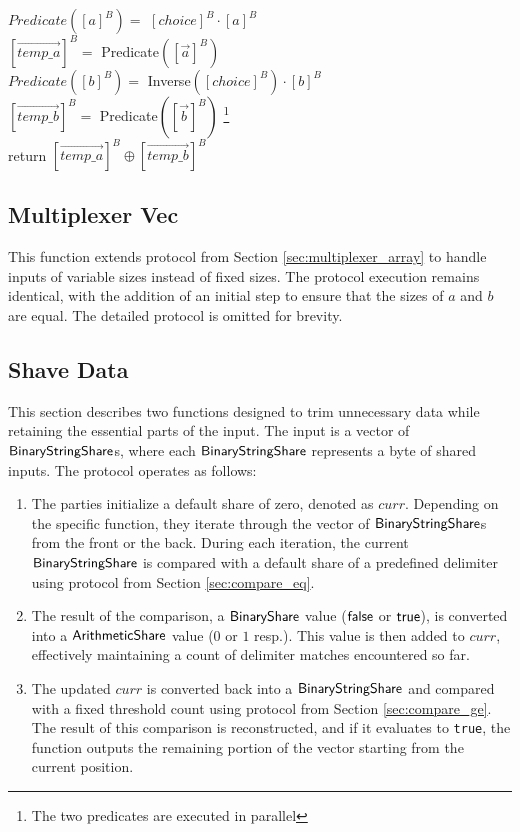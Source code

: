 \begin{protocol}[MultiplexerArray$({[choice]^B}, {[\vec{a}]^B}, {[\vec{b}]^B})$]
	$Predicate([a]^B) =$ ${[choice]^B} \cdot {[a]^B}$\\
	${[\vec{temp\_a}]^B} =$ Predicate$({[\vec{a}]^B})$\\
	$Predicate([b]^B) =$ Inverse$({[choice]^B}) \cdot {[b]^B}$\\
	${[\vec{temp\_b}]^B} =$ Predicate$({[\vec{b}]^B})$ \footnote{The two predicates are executed in parallel} \\ 
        return ${[\vec{temp\_a}]^B} \oplus {[\vec{temp\_b}]^B}$
\end{protocol}

\subsection{Multiplexer Vec}
\label{sec:multiplexer_vec}

This function extends protocol from Section \ref{sec:multiplexer_array} to handle inputs of variable sizes instead of fixed sizes. The protocol execution remains identical, with the addition of an initial step to ensure that the sizes of $a$ and $b$ are equal. The detailed protocol is omitted for brevity.

\subsection{Shave Data}
\label{sec:shave_data}

This section describes two functions designed to trim unnecessary data while retaining the essential parts of the input. The input is a vector of ${\mathsf{BinaryStringShare}}$s, where each ${\mathsf{BinaryStringShare}}$ represents a byte of shared inputs. The protocol operates as follows:

\begin{enumerate}
    \item The parties initialize a default share of zero, denoted as $curr$. Depending on the specific function, they iterate through the vector of ${\mathsf{BinaryStringShare}}$s from the front or the back. During each iteration, the current ${\mathsf{BinaryStringShare}}$ is compared with a default share of a predefined delimiter using protocol from Section \ref{sec:compare_eq}. 
    \item The result of the comparison, a ${\mathsf{BinaryShare}}$ value ($\mathsf{false}$ or $\mathsf{true}$), is converted into a ${\mathsf{ArithmeticShare}}$ value ($0$ or $1$ resp.). This value is then added to $curr$, effectively maintaining a count of delimiter matches encountered so far.
    \item The updated $curr$ is converted back into a ${\mathsf{BinaryStringShare}}$ and compared with a fixed threshold count using protocol from Section \ref{sec:compare_ge}. The result of this comparison is reconstructed, and if it evaluates to \texttt{true}, the function outputs the remaining portion of the vector starting from the current position.
\end{enumerate}

